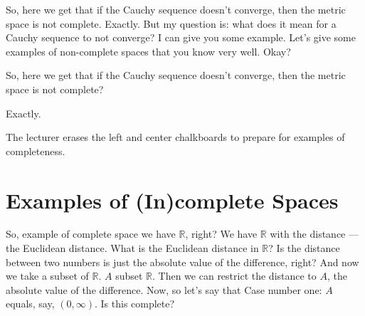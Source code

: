 \begin{spoken-clean}[00:02:26 - 00:03:12]
So, here we get that if the Cauchy sequence doesn't converge, then the metric space is not complete. Exactly. But my question is: what does it mean for a Cauchy sequence to not converge? I can give you some example. Let's give some examples of non-complete spaces that you know very well. Okay?
\end{spoken-clean}

\begin{student-question}
So, here we get that if the Cauchy sequence doesn't converge, then the metric space is not complete?
\end{student-question}

\begin{spoken-clean}[continued]
Exactly.
\end{spoken-clean}

\begin{meta-note}[Transition]
The lecturer erases the left and center chalkboards to prepare for examples of completeness.
\end{meta-note}

\section{Examples of (In)complete Spaces}

\begin{spoken-clean}[00:04:05 - 00:05:24]
So, example of complete space we have $\mathbb{R}$, right? We have $\mathbb{R}$ with the distance --- the Euclidean distance.  What is the Euclidean distance in $\mathbb{R}$? Is the distance between two numbers is just the absolute value of the difference, right? And now we take a subset of $\mathbb{R}$. $A$ subset $\mathbb{R}$. Then we can restrict the distance to $A$, the absolute value of the difference. Now, so let's say that Case number one: $A$ equals, say, $(0, \infty)$. Is this complete?
\end{spoken-clean}

